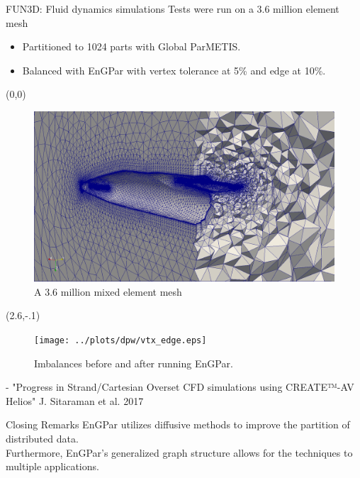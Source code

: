 \documentclass{beamer}
\begin{document}
\begin{textblock}{15.6}
\begin{textblock}{5.2}
\begin{block}{\centering FUN3D: Fluid dynamics simulations}
      Tests were run on a 3.6 million element mesh
      \vspace{-.1cm}
      \begin{itemize}
      \item Partitioned to 1024 parts with Global ParMETIS.
      \item Balanced with EnGPar with vertex tolerance at 5\% and edge at 10\%.
      \end{itemize}
      \begin{textblock}{2.6}(0,0)
      \begin{figure}
        \centering
        \includegraphics[width=.9\textwidth]{../figures/dpw.png}
        \caption{A 3.6 million mixed element mesh}
      \end{figure}
      \end{textblock}
      
      \begin{textblock}{2.6}(2.6,-.1)
      \begin{figure}
        \centering
        \texttt{[image: ../plots/dpw/vtx\_edge.eps]}
        \caption{Imbalances before and after running EnGPar.}
      \end{figure}
      \end{textblock}
      \vspace{14.1cm}
    \end{block}
    \vspace{-.7cm}
    {\fontsize{22}{23} - "Progress in Strand/Cartesian Overset CFD simulations using CREATE™-AV Helios" J. Sitaraman et al. 2017
    }

    \begin{block}{\centering Closing Remarks}
      EnGPar utilizes diffusive methods to improve the partition of distributed data. \\
      Furthermore, EnGPar's generalized graph structure allows for the techniques to \\
      multiple applications.
    \end{block}
  \end{textblock}
\end{textblock}
\end{document}
